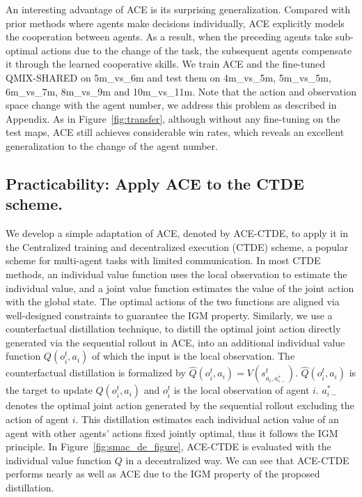 \documentclass[letterpaper]{article} \usepackage{aaai23}  \usepackage{times}  \usepackage{helvet}  \usepackage{courier}  \usepackage[hyphens]{url}  \usepackage{graphicx} \urlstyle{rm} \def\UrlFont{\rm}  \usepackage{natbib}  \usepackage{caption} \frenchspacing  \setlength{\pdfpagewidth}{8.5in} \setlength{\pdfpageheight}{11in} \usepackage{algorithm}
\begin{document}
An interesting advantage of ACE is its surprising generalization. Compared with prior methods where agents make decisions individually, ACE explicitly models the cooperation between agents. As a result, when the preceding agents take sub-optimal actions due to the change of the task, the subsequent agents compensate it through the learned cooperative skills. 
We train ACE and the fine-tuned QMIX-SHARED on 5m\_vs\_6m and test them on 4m\_vs\_5m, 5m\_vs\_5m, 6m\_vs\_7m, 8m\_vs\_9m and 10m\_vs\_11m. 
Note that the action and observation space change with the agent number, we address this problem as described in Appendix.
As in Figure~\ref{fig:transfer}, although without any fine-tuning on the test maps, ACE still achieves considerable win rates, which reveals an excellent generalization to the change of the agent number. 

\vspace{-1ex}
\subsection{\textbf{Practicability:} Apply ACE to the CTDE scheme.}
\vspace{-1ex}
We develop a simple adaptation of ACE, denoted by ACE-CTDE, to apply it in the Centralized training and decentralized execution (CTDE) scheme, a popular scheme for multi-agent tasks with limited communication. In most CTDE methods, an individual value function uses the local observation to estimate the individual value, and a joint value function estimates the value of the joint action with the global state. The optimal actions of the two functions are aligned via well-designed constraints to guarantee the IGM property.
Similarly, we use a counterfactual distillation technique, to distill the optimal joint action directly generated via the sequential rollout in ACE, into an additional individual value function $Q\left(o_i^t,a_i\right)$ of which the input is the local observation. The counterfactual distillation is formalized by $
    \hat{Q}\left(o_i^t,a_i\right)=
    V\left(s_{a_i,a_{i-}^*}^t\right)$.
$\hat{Q}\left(o_i^t,a_i\right)$ is the target to update $Q\left(o_i^t,a_i\right)$ and $o_i^t$ is the local observation of agent $i$. $a_{i-}^*$ denotes the optimal joint action generated by the sequential rollout excluding the action of agent $i$. This distillation estimates each individual action value of an agent with other agents' actions fixed jointly optimal, thus it follows the IGM principle. 
In Figure~\ref{fig:smac_de_figure}, ACE-CTDE is evaluated with the individual value function $Q$ in a decentralized way. We can see that ACE-CTDE performs nearly as well as ACE due to the IGM property of the proposed distillation.
\end{document}
